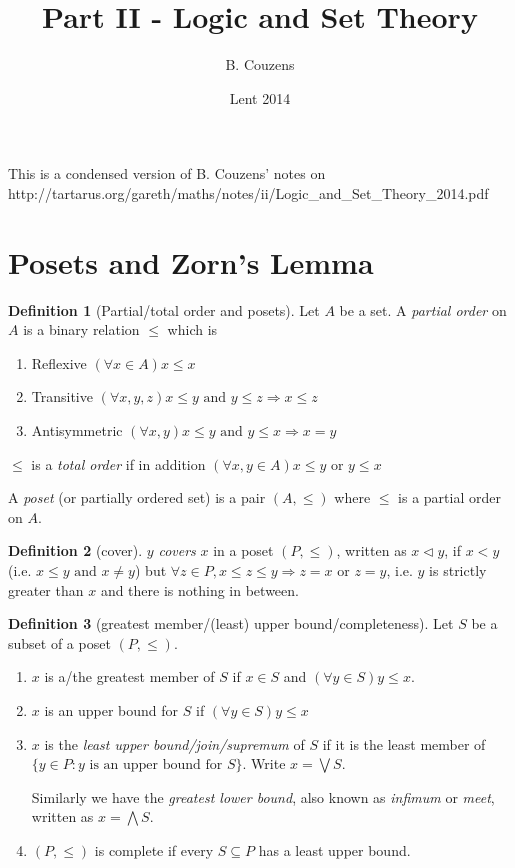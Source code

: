 \documentclass[a4paper]{article}
\title{Part II - Logic and Set Theory}
\author{B. Couzens}
\date{Lent 2014}
\theoremstyle{definition}
\newtheorem*{defi}{Definition}
\let\stdsection\section
\renewcommand\section{\newpage\stdsection}
\begin{document}
\maketitle
This is a condensed version of B. Couzens' notes on\\
http://tartarus.org/gareth/maths/notes/ii/Logic\_and\_Set\_Theory\_2014.pdf

\section{Posets and Zorn's Lemma}
\begin{defi}[Partial/total order and posets]
  Let $A$ be a set. A \emph{partial order} on $A$ is a binary relation $\leq$ which is
  \begin{enumerate}
  \item Reflexive $(\forall x\in A)x\leq x$
  \item Transitive $(\forall x, y, z) x\leq y\text{ and } y\leq z \Rightarrow x\leq z$
  \item Antisymmetric $(\forall x, y) x\leq y\text{ and } y\leq x \Rightarrow x = y$
  \end{enumerate}

  $\leq$ is a \emph{total order} if in addition $(\forall x, y\in A) x\leq y\text{ or }y\leq x$

  A \emph{poset} (or partially ordered set) is a pair $(A, \leq)$ where $\leq$ is a partial order on $A$.
\end{defi}

\begin{defi}[cover]
  $y$ \emph{covers} $x$ in a poset $(P, \leq)$, written as $x\lhd y$, if $x < y$ (i.e. $x\leq y\text{ and }x \not= y$) but $\forall z\in P, x\leq z \leq y \Rightarrow z = x\text{ or }z = y$, i.e. $y$ is strictly greater than $x$ and there is nothing in between.
\end{defi}

\begin{defi}[greatest member/(least) upper bound/completeness]
  Let $S$ be a subset of a poset $(P, \leq)$.
  \begin{enumerate}
  \item $x$ is a/the greatest member of $S$ if $x\in S$ and $(\forall y\in S) y\leq x$.
  \item $x$ is an upper bound for $S$ if $(\forall y\in S) y\leq x$
  \item $x$ is the \emph{least upper bound/join/supremum} of $S$ if it is the least member of $\{y\in P: y\text{ is an upper bound for }S\}$. Write $x = \bigvee S$.

    Similarly we have the \emph{greatest lower bound}, also known as \emph{infimum} or \emph{meet}, written as $x = \bigwedge S$.
  \item $(P, \leq)$ is complete if every $S\subseteq P$ has a least upper bound.
  \end{enumerate}
\end{defi}
\end{document}
